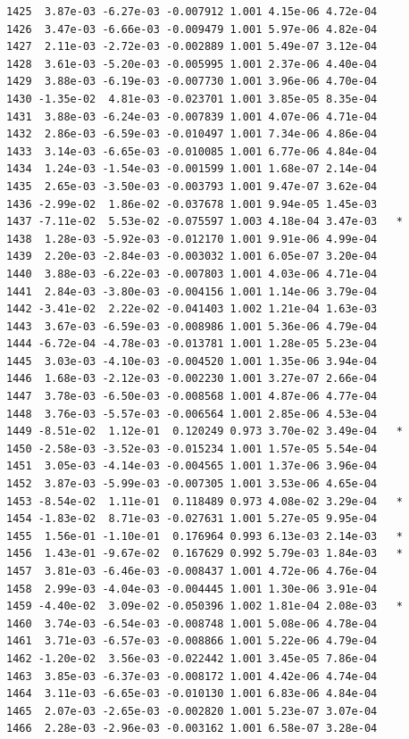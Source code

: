 \documentclass[
  letterpaper,
  DIV=11,
  numbers=noendperiod]{scrartcl}
\begin{document}
\begin{verbatim}
1425  3.87e-03 -6.27e-03 -0.007912 1.001 4.15e-06 4.72e-04    
1426  3.47e-03 -6.66e-03 -0.009479 1.001 5.97e-06 4.82e-04    
1427  2.11e-03 -2.72e-03 -0.002889 1.001 5.49e-07 3.12e-04    
1428  3.61e-03 -5.20e-03 -0.005995 1.001 2.37e-06 4.40e-04    
1429  3.88e-03 -6.19e-03 -0.007730 1.001 3.96e-06 4.70e-04    
1430 -1.35e-02  4.81e-03 -0.023701 1.001 3.85e-05 8.35e-04    
1431  3.88e-03 -6.24e-03 -0.007839 1.001 4.07e-06 4.71e-04    
1432  2.86e-03 -6.59e-03 -0.010497 1.001 7.34e-06 4.86e-04    
1433  3.14e-03 -6.65e-03 -0.010085 1.001 6.77e-06 4.84e-04    
1434  1.24e-03 -1.54e-03 -0.001599 1.001 1.68e-07 2.14e-04    
1435  2.65e-03 -3.50e-03 -0.003793 1.001 9.47e-07 3.62e-04    
1436 -2.99e-02  1.86e-02 -0.037678 1.001 9.94e-05 1.45e-03    
1437 -7.11e-02  5.53e-02 -0.075597 1.003 4.18e-04 3.47e-03   *
1438  1.28e-03 -5.92e-03 -0.012170 1.001 9.91e-06 4.99e-04    
1439  2.20e-03 -2.84e-03 -0.003032 1.001 6.05e-07 3.20e-04    
1440  3.88e-03 -6.22e-03 -0.007803 1.001 4.03e-06 4.71e-04    
1441  2.84e-03 -3.80e-03 -0.004156 1.001 1.14e-06 3.79e-04    
1442 -3.41e-02  2.22e-02 -0.041403 1.002 1.21e-04 1.63e-03    
1443  3.67e-03 -6.59e-03 -0.008986 1.001 5.36e-06 4.79e-04    
1444 -6.72e-04 -4.78e-03 -0.013781 1.001 1.28e-05 5.23e-04    
1445  3.03e-03 -4.10e-03 -0.004520 1.001 1.35e-06 3.94e-04    
1446  1.68e-03 -2.12e-03 -0.002230 1.001 3.27e-07 2.66e-04    
1447  3.78e-03 -6.50e-03 -0.008568 1.001 4.87e-06 4.77e-04    
1448  3.76e-03 -5.57e-03 -0.006564 1.001 2.85e-06 4.53e-04    
1449 -8.51e-02  1.12e-01  0.120249 0.973 3.70e-02 3.49e-04   *
1450 -2.58e-03 -3.52e-03 -0.015234 1.001 1.57e-05 5.54e-04    
1451  3.05e-03 -4.14e-03 -0.004565 1.001 1.37e-06 3.96e-04    
1452  3.87e-03 -5.99e-03 -0.007305 1.001 3.53e-06 4.65e-04    
1453 -8.54e-02  1.11e-01  0.118489 0.973 4.08e-02 3.29e-04   *
1454 -1.83e-02  8.71e-03 -0.027631 1.001 5.27e-05 9.95e-04    
1455  1.56e-01 -1.10e-01  0.176964 0.993 6.13e-03 2.14e-03   *
1456  1.43e-01 -9.67e-02  0.167629 0.992 5.79e-03 1.84e-03   *
1457  3.81e-03 -6.46e-03 -0.008437 1.001 4.72e-06 4.76e-04    
1458  2.99e-03 -4.04e-03 -0.004445 1.001 1.30e-06 3.91e-04    
1459 -4.40e-02  3.09e-02 -0.050396 1.002 1.81e-04 2.08e-03   *
1460  3.74e-03 -6.54e-03 -0.008748 1.001 5.08e-06 4.78e-04    
1461  3.71e-03 -6.57e-03 -0.008866 1.001 5.22e-06 4.79e-04    
1462 -1.20e-02  3.56e-03 -0.022442 1.001 3.45e-05 7.86e-04    
1463  3.85e-03 -6.37e-03 -0.008172 1.001 4.42e-06 4.74e-04    
1464  3.11e-03 -6.65e-03 -0.010130 1.001 6.83e-06 4.84e-04    
1465  2.07e-03 -2.65e-03 -0.002820 1.001 5.23e-07 3.07e-04    
1466  2.28e-03 -2.96e-03 -0.003162 1.001 6.58e-07 3.28e-04    

\end{verbatim}
\end{document}
